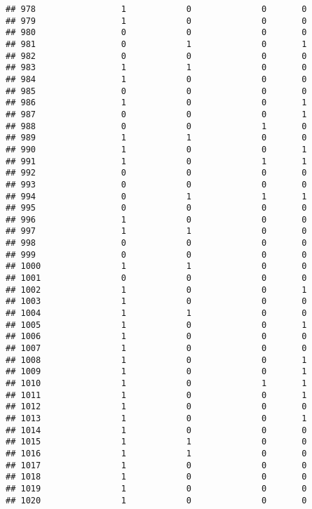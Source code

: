 \documentclass[]{article}
\begin{document}
\begin{verbatim}
## 978                 1            0              0       0
## 979                 1            0              0       0
## 980                 0            0              0       0
## 981                 0            1              0       1
## 982                 0            0              0       0
## 983                 1            1              0       0
## 984                 1            0              0       0
## 985                 0            0              0       0
## 986                 1            0              0       1
## 987                 0            0              0       1
## 988                 0            0              1       0
## 989                 1            1              0       0
## 990                 1            0              0       1
## 991                 1            0              1       1
## 992                 0            0              0       0
## 993                 0            0              0       0
## 994                 0            1              1       1
## 995                 0            0              0       0
## 996                 1            0              0       0
## 997                 1            1              0       0
## 998                 0            0              0       0
## 999                 0            0              0       0
## 1000                1            1              0       0
## 1001                0            0              0       0
## 1002                1            0              0       1
## 1003                1            0              0       0
## 1004                1            1              0       0
## 1005                1            0              0       1
## 1006                1            0              0       0
## 1007                1            0              0       0
## 1008                1            0              0       1
## 1009                1            0              0       1
## 1010                1            0              1       1
## 1011                1            0              0       1
## 1012                1            0              0       0
## 1013                1            0              0       1
## 1014                1            0              0       0
## 1015                1            1              0       0
## 1016                1            1              0       0
## 1017                1            0              0       0
## 1018                1            0              0       0
## 1019                1            0              0       0
## 1020                1            0              0       0

\end{verbatim}
\end{document}
